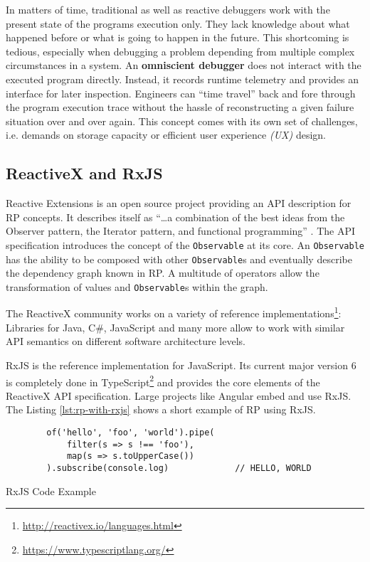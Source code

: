 \documentclass[12pt,a4paper]{article}
\begin{document}
In matters of time, traditional as well as reactive debuggers work with the present state of the programs execution only. They lack knowledge about what happened before or what is going to happen in the future. This shortcoming is tedious, especially when debugging a problem depending from multiple complex circumstances in a system. An \textbf{omniscient debugger} \cite{5287015} \cite{DBLP:journals/corr/OCallahanJFHNP17} does not interact with the executed program directly. Instead, it records runtime telemetry and provides an interface for later inspection. Engineers can ``time travel'' back and fore through the program execution trace without the hassle of reconstructing a given failure situation over and over again. This concept comes with its own set of challenges, i.e. demands on storage capacity or efficient user experience \emph{(UX)} design. \cite{omniscientDebuggerProblems}

\subsection{ReactiveX and RxJS}

Reactive Extensions is an open source project providing an API description for RP concepts. It describes itself as ``\dots a combination of the best ideas from the Observer pattern, the Iterator pattern, and functional programming'' \cite{reactivex}.  The API specification introduces the concept of the  \texttt{Observable} at its core. An \texttt{Observable} has the ability to be composed with other \texttt{Observable}s and eventually describe the dependency graph known in RP. A multitude of operators allow the transformation of values and \texttt{Observable}s within the graph.

The ReactiveX community works on a variety of reference implementations\footnote{\url{http://reactivex.io/languages.html}}: Libraries for Java, C\#, JavaScript and many more allow to work with similar API semantics on different software architecture levels.

RxJS is the reference implementation for JavaScript. Its current major version 6 is completely done in TypeScript\footnote{\url{https://www.typescriptlang.org/}} and provides the core elements of the ReactiveX API specification. Large projects like Angular embed and use RxJS\cite{angualrrxjs}. The Listing \ref{lst:rp-with-rxjs} shows a short example of RP using RxJS.

\begin{listing}[H]
	\begin{verbatim}
		of('hello', 'foo', 'world').pipe(
			filter(s => s !== 'foo'),
			map(s => s.toUpperCase())
		).subscribe(console.log)             // HELLO, WORLD
	\end{verbatim}
	\caption{RxJS Code Example}
	\label{lst:rp-with-rxjs}
\end{listing}
\end{document}
